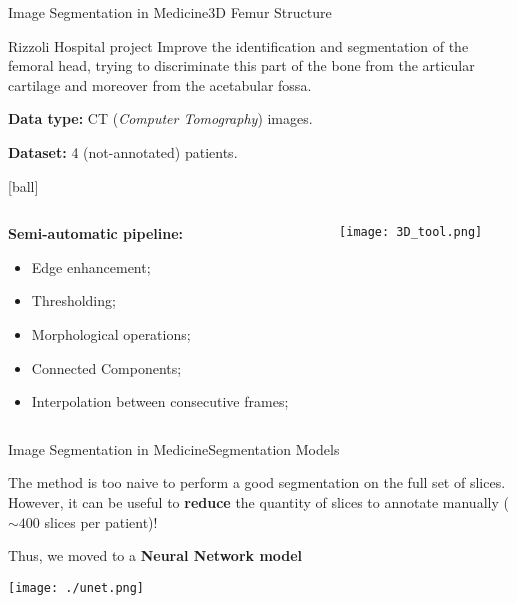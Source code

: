 \documentclass[10pt, technote, oribibl, unicode]{beamer}
\begin{document}
\begin{frame}{Image Segmentation in Medicine}{3D Femur Structure}


  \begin{alertblock}{Rizzoli Hospital project}
    \scriptsize{Improve the identification and segmentation of the femoral head, trying to discriminate this part of the bone from the articular cartilage and moreover from the acetabular fossa.}

    \vspace{0.5cm}
    \scriptsize{\textbf{Data type:} CT (\emph{Computer Tomography}) images.}

    \vspace{0.5cm}
    \scriptsize{\textbf{Dataset:} 4 (not-annotated) patients.}
  \end{alertblock}

  [ball]

  \begin{columns}
    \begin{column}{0.5\linewidth}
      \scriptsize{\textbf{Semi-automatic pipeline:}}

      \begin{itemize}
        \item Edge enhancement;
        \item Thresholding;
        \item Morphological operations;
        \item Connected Components;
        \item Interpolation between consecutive frames;
      \end{itemize}

    \end{column}
    \begin{column}{0.5\linewidth}
      \centering\texttt{[image: 3D\_tool.png]}
    \end{column}

  \end{columns}

\end{frame}

\begin{frame}{Image Segmentation in Medicine}{Segmentation Models}

  \scriptsize{The method is too naive to perform a good segmentation on the full set of slices.}
  \scriptsize{However, it can be useful to \textbf{reduce} the quantity of slices to annotate manually ($\sim400$ slices per patient)!}


  \centering{}

  \scriptsize{Thus, we moved to a \textbf{Neural Network model}}

  \centering\texttt{[image: ./unet.png]}

\end{frame}
\end{document}
